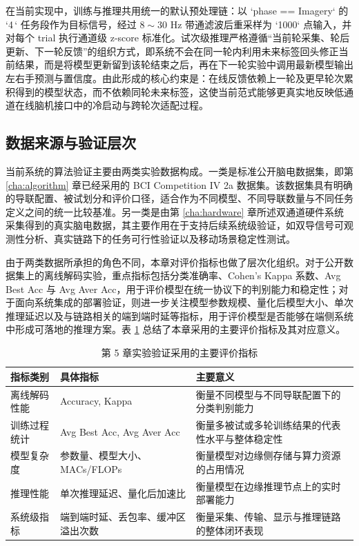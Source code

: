 在当前实现中，训练与推理共用统一的默认预处理链：以 `phase == Imagery` 的 `4\,` 任务段作为目标信号，经过 $8 \sim 30$ Hz 带通滤波后重采样为 `1000` 点输入，并对每个 trial 执行通道级 z-score 标准化。试次级推理严格遵循“当前轮采集、轮后更新、下一轮反馈”的组织方式，即系统不会在同一轮内利用未来标签回头修正当前结果，而是将模型更新留到该轮结束之后，再在下一轮实验中调用最新模型输出左右手预测与置信度。由此形成的核心约束是：在线反馈依赖上一轮及更早轮次累积得到的模型状态，而不依赖同轮未来标签，这使当前范式能够更真实地反映低通道在线脑机接口中的冷启动与跨轮次适配过程。

\subsection{数据来源与验证层次}

当前系统的算法验证主要由两类实验数据构成。一类是标准公开脑电数据集，即第 \ref{cha:algorithm} 章已经采用的 BCI Competition IV 2a 数据集。该数据集具有明确的导联配置、被试划分和评价口径，适合作为不同模型、不同导联数量与不同任务定义之间的统一比较基准。另一类是由第 \ref{cha:hardware} 章所述双通道硬件系统采集得到的真实脑电数据，其主要作用在于支持后续系统级验证，如双导信号可观测性分析、真实链路下的任务可行性验证以及移动场景稳定性测试。

由于两类数据所承担的角色不同，本章对评价指标也做了层次化组织。对于公开数据集上的离线解码实验，重点指标包括分类准确率、Cohen's Kappa 系数、Avg Best Acc 与 Avg Aver Acc，用于评价模型在统一协议下的判别能力和稳定性；对于面向系统集成的部署验证，则进一步关注模型参数规模、量化后模型大小、单次推理延迟以及与链路相关的端到端时延等指标，用于评价模型是否能够在端侧系统中形成可落地的推理方案。表 \ref{tab:c5_metrics} 总结了本章采用的主要评价指标及其对应意义。

\begin{table}[htbp]
    \centering
    \caption{第 5 章实验验证采用的主要评价指标}
    \label{tab:c5_metrics}
    \begin{tabular}{p{3.2cm}p{3.0cm}p{6.7cm}}
        \hline
        指标类别 & 具体指标 & 主要意义 \\
        \hline
        离线解码性能 & Accuracy, Kappa & 衡量不同模型与不同导联配置下的分类判别能力 \\
        训练过程统计 & Avg Best Acc, Avg Aver Acc & 衡量多被试或多轮训练结果的代表性水平与整体稳定性 \\
        模型复杂度 & 参数量、模型大小、MACs/FLOPs & 衡量模型对边缘侧存储与算力资源的占用情况 \\
        推理性能 & 单次推理延迟、量化后加速比 & 衡量模型在边缘推理节点上的实时部署能力 \\
        系统级指标 & 端到端时延、丢包率、缓冲区溢出次数 & 衡量采集、传输、显示与推理链路的整体闭环表现 \\
        \hline
    \end{tabular}
\end{table}

